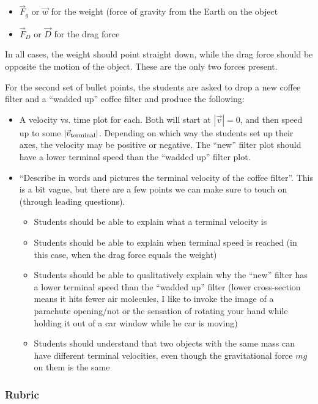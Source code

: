 \documentclass[fleqn,letterpaper]{article}
\begin{document}
\begin{itemize}
 \item{$\vec{F}_g$ or $\vec{w}$ for the weight (force of gravity from the Earth on the object}
 \item{$\vec{F}_D$ or $\vec{D}$ for the drag force}
\end{itemize}

In all cases, the weight should point straight down, while the drag force should be opposite the motion of the object.  These are the only two forces present.

For the second set of bullet points, the students are asked to drop a new coffee filter and a ``wadded up'' coffee filter and produce the following:
\begin{itemize}
 \item{A velocity vs. time plot for each.  Both will start at $|\vec{v}| = 0$, and then speed up to some $|\vec{v}_{\rm terminal}|$.  Depending on which way the students set up their axes, the velocity may be positive or negative.  The ``new'' filter plot should have a lower terminal speed than the ``wadded up'' filter plot.}
 \item{``Describe in words and pictures the terminal velocity of the coffee filter''.  This is a bit vague, but there are a few points we can make sure to touch on (through leading questions).
 \begin{itemize}
 \item{Students should be able to explain what a terminal velocity is}
 \item{Students should be able to explain when terminal speed is reached (in this case, when the drag force equals the weight)}
 \item{Students should be able to qualitatively explain why the ``new'' filter has a lower terminal speed than the ``wadded up'' filter (lower cross-section means it hits fewer air molecules, I like to invoke the image of a parachute opening/not or the sensation of rotating your hand while holding it out of a car window while he car is  moving)}
 \item{Students should understand that two objects with the same mass can have different terminal velocities, even though the gravitational force $mg$ on them is the same}
 \end{itemize}}
\end{itemize}



\subsubsection*{Rubric}
\end{document}
